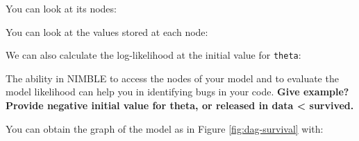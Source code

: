 \documentclass[
  12pt,
]{krantz}
\newenvironment{Shaded}{\begin{snugshade}}{\end{snugshade}}
\newcommand{\CommentTok}[1]{\textcolor[rgb]{0.56,0.35,0.01}{\textit{#1}}}
\newcommand{\DocumentationTok}[1]{\textcolor[rgb]{0.56,0.35,0.01}{\textbf{\textit{#1}}}}
\newcommand{\FunctionTok}[1]{\textcolor[rgb]{0.13,0.29,0.53}{\textbf{#1}}}
\newcommand{\NormalTok}[1]{#1}
\newcommand{\SpecialCharTok}[1]{\textcolor[rgb]{0.81,0.36,0.00}{\textbf{#1}}}
\begin{document}
You can look at its nodes:

\begin{Shaded}
\end{Shaded}

You can look at the values stored at each node:

\begin{Shaded}
\end{Shaded}

We can also calculate the log-likelihood at the initial value for \texttt{theta}:

\begin{Shaded}
\end{Shaded}

The ability in NIMBLE to access the nodes of your model and to evaluate the model likelihood can help you in identifying bugs in your code. \textbf{Give example? Provide negative initial value for theta, or released in data \textless{} survived.}

You can obtain the graph of the model as in Figure \ref{fig:dag-survival} with:

\begin{Shaded}
\end{Shaded}
\end{document}
